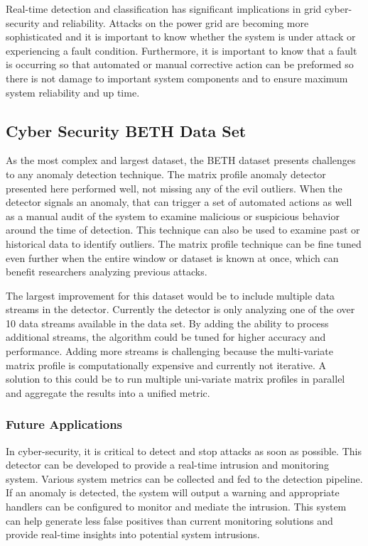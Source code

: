 Real-time detection and classification has significant implications in grid cyber-security and reliability. Attacks on the power grid are becoming more sophisticated and it is important to know whether the system is under attack or experiencing a fault condition. Furthermore, it is important to know that a fault is occurring so that automated or manual corrective action can be preformed so there is not damage to important system components and to ensure maximum system reliability and up time.

\subsection{Cyber Security BETH Data Set}

As the most complex and largest dataset, the BETH dataset presents challenges to any anomaly detection technique. The matrix profile anomaly detector presented here performed well, not missing any of the evil outliers. When the detector signals an anomaly, that can trigger a set of automated actions as well as a manual audit of the system to examine malicious or suspicious behavior around the time of detection. This technique can also be used to examine past or historical data to identify outliers. The matrix profile technique can be fine tuned even further when the entire window or dataset is known at once, which can benefit researchers analyzing previous attacks. 

The largest improvement for this dataset would be to include multiple data streams in the detector. Currently the detector is only analyzing one of the over 10 data streams available in the data set. By adding the ability to process additional streams, the algorithm could be tuned for higher accuracy and performance. Adding more streams is challenging because the multi-variate matrix profile is computationally expensive and currently not iterative. A solution to this could be to run multiple uni-variate matrix profiles in parallel and aggregate the results into a unified metric. 

\subsubsection{Future Applications}

In cyber-security, it is critical to detect and stop attacks as soon as possible. This detector can be developed to provide a real-time intrusion and monitoring system. Various system metrics can be collected and fed to the detection pipeline. If an anomaly is detected, the system will output a warning and appropriate handlers can be configured to monitor and mediate the intrusion. This system can help generate less false positives than current monitoring solutions and provide real-time insights into potential system intrusions. 

